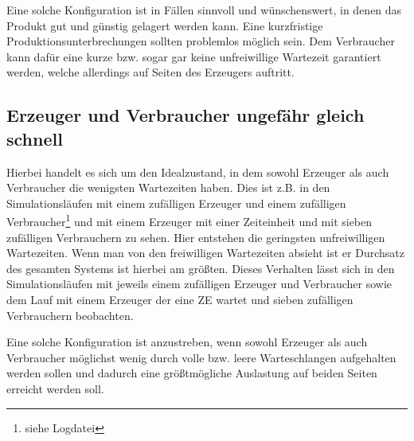 Eine solche Konfiguration ist in Fällen sinnvoll und wünschenswert, in denen das Produkt gut und günstig gelagert werden kann. Eine kurzfristige Produktionsunterbrechungen sollten problemlos möglich sein. Dem Verbraucher kann dafür eine kurze bzw. sogar gar keine unfreiwillige Wartezeit garantiert werden, welche allerdings auf Seiten des Erzeugers auftritt.

\subsection{Erzeuger und Verbraucher ungefähr gleich schnell} %
\label{sub:erzeuger_und_verbraucher_gleich_schnell}
Hierbei handelt es sich um den Idealzustand, in dem sowohl Erzeuger als auch Verbraucher die wenigsten Wartezeiten haben. Dies ist z.B. in den Simulationsläufen mit einem zufälligen Erzeuger und einem zufälligen Verbraucher\footnote{siehe Logdatei } und mit einem Erzeuger mit einer Zeiteinheit und mit sieben zufälligen Verbrauchern zu sehen. Hier entstehen die geringsten unfreiwilligen Wartezeiten. Wenn man von den freiwilligen Wartezeiten absieht ist er Durchsatz des gesamten Systems ist hierbei am größten. Dieses Verhalten lässt sich in den Simulationsläufen mit jeweils einem zufälligen Erzeuger und Verbraucher sowie dem Lauf mit einem Erzeuger der eine \ac{ZE} wartet und sieben zufälligen Verbrauchern beobachten.

Eine solche Konfiguration ist anzustreben, wenn sowohl Erzeuger als auch Verbraucher möglichst wenig durch volle bzw. leere Warteschlangen aufgehalten werden sollen und dadurch eine größtmögliche Auslastung auf beiden Seiten erreicht werden soll.


